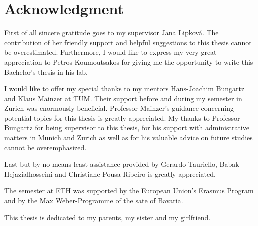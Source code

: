 \chapter{Acknowledgment}
First of all sincere gratitude goes to my supervisor Jana Lipkov\'a. The contribution of her friendly support and helpful suggestions to this thesis cannot be overestimated. 
Furthermore, I would like to express my very great appreciation to Petros Koumoutsakos for giving me the opportunity to write this Bachelor's thesis in his lab. 

I would like to offer my special thanks to my mentors Hans-Joachim Bungartz and Klaus Mainzer at TUM. Their support before and during my semester in Zurich was enormously beneficial. Professor Mainzer's guidance concerning potential topics for this thesis is greatly appreciated. My thanks to Professor Bungartz for being supervisor to this thesis, for his support with administrative matters in Munich and Zurich as well as for his valuable advice on future studies cannot be overemphasized. 

Last but by no means least assistance provided by Gerardo Tauriello, Babak Hejazialhosseini and Christiane Pousa Ribeiro is greatly appreciated. 

The semester at ETH was supported by the European Union's Erasmus Program and by the Max Weber-Programme of the sate of Bavaria. 

This thesis is dedicated to my parents, my sister and my girlfriend.